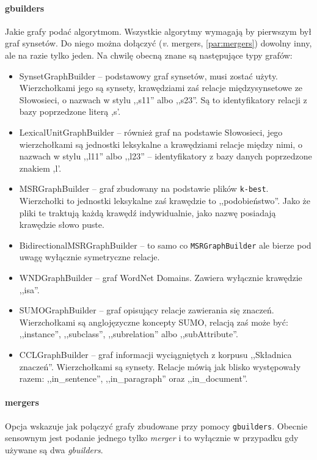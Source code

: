 \documentclass[10pt,a4paper]{article}
\begin{document}
\paragraph{gbuilders}
Jakie grafy podać algorytmom. Wszystkie algorytmy wymagają by pierwszym był graf synsetów. Do niego można dołączyć (\textit{v.} mergers, \ref{par:mergers}) dowolny inny, ale na razie tylko jeden. Na chwilę obecną znane są następujące typy grafów:
\begin{itemize}  %
	\item SynsetGraphBuilder -- podstawowy graf synsetów, musi zostać użyty. Wierzchołkami jego są synsety, krawędziami zaś relacje międzysynsetowe ze Słowosieci, o nazwach w stylu ,,s11'' albo ,,s23''. Są to identyfikatory relacji z bazy poprzedzone literą ,s'.
	\item LexicalUnitGraphBuilder -- również graf na podstawie Słowosieci, jego wierzchołkami są jednostki leksykalne a krawędziami relacje między nimi, o nazwach w stylu ,,l11'' albo ,,l23'' -- identyfikatory z bazy danych poprzedzone znakiem ,l'.
	\item MSRGraphBuilder  -- graf zbudowany na podstawie plików \texttt{k-best}. Wierzchołki to jednostki leksykalne zaś krawędzie to ,,podobieństwo''. Jako że pliki te traktują każdą krawędź indywidualnie, jako nazwę posiadają krawędzie słowo puste.
	\item BidirectionalMSRGraphBuilder  -- to samo co \texttt{MSRGraphBuilder} ale bierze pod uwagę wyłącznie symetryczne relacje.
	\item WNDGraphBuilder  -- graf WordNet Domains. Zawiera wyłącznie krawędzie ,,isa''.
	\item SUMOGraphBuilder -- graf opisujący relacje zawierania się znaczeń. Wierzchołkami są anglojęzyczne koncepty SUMO, relacją zaś może być: ,,instance'', ,,subclass'', ,,subrelation'' albo ,,subAttribute''.
	\item CCLGraphBuilder -- graf informacji wyciągniętych z korpusu ,,Składnica znaczeń''. Wierzchołkami są synsety. Relacje mówią jak blisko występowały razem: ,,in\_sentence'', ,,in\_paragraph'' oraz ,,in\_document''.
\end{itemize}


\paragraph{mergers}
\label{par:mergers}
Opcja wskazuje jak połączyć grafy zbudowane przy pomocy \texttt{gbuilders}. Obecnie sensownym jest podanie jednego tylko \textit{merger} i to wyłącznie w przypadku gdy używane są dwa \textit{gbuilders}.
\end{document}
